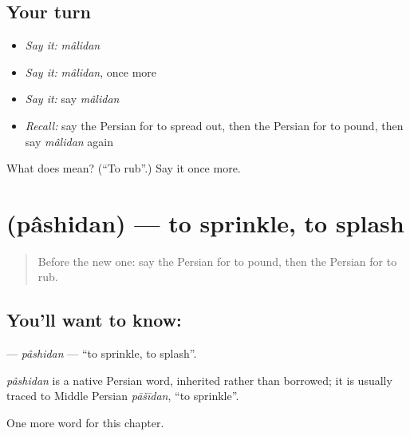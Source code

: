 \subsection*{Your turn}
\begin{itemize}
\raggedright
  \item \emph{Say it:} \emph{mâlidan}
  \item \emph{Say it:} \emph{mâlidan}, once more
  \item \emph{Say it:} say \emph{mâlidan}
  \item \emph{Recall:} say the Persian for to spread out, then the Persian for to pound, then say \emph{mâlidan} again
\end{itemize}

\begin{tcolorbox}[breakable,colback=teal!4,colframe=teal!35!black,title={Before you move on}]
What does  mean? (\textquotedblleft{}To rub\textquotedblright{}.) Say it once more.
\end{tcolorbox}
\section[\texorpdfstring{\fa{پاشیدن} (pâshidan)}{پاشیدن (pâshidan)}]{ (pâshidan) — to sprinkle, to splash}

\label{lesson:FA-C147-pashidan}



\begin{quote}
Before the new one: say the Persian for to pound, then the Persian for to rub.
\end{quote}

\subsection*{You'll want to know: }
\textbf{} — \emph{pâshidan} — \textquotedblleft{}to sprinkle, to splash\textquotedblright{}.

\begin{cousinweb}
\emph{pâshidan} is a native Persian word, inherited rather than borrowed; it is usually traced to Middle Persian \emph{pāšīdan}, \textquotedblleft{}to sprinkle\textquotedblright{}.
\end{cousinweb}

\begin{grammarlens}[title={What you've built}]
One more word for this chapter.
\end{grammarlens}


